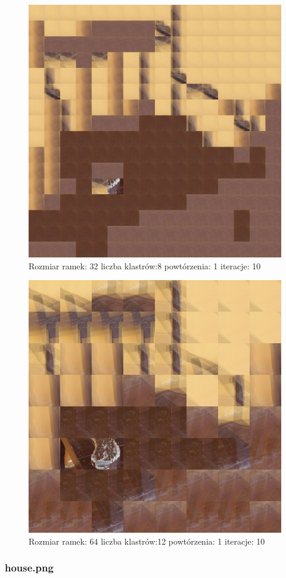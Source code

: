 \documentclass{classrep}
\begin{document}
{{{{\begin{figure}[!htbp]
\centering
\includegraphics[width=\textwidth,width=90mm]{obrazy/chair_R32_K8_P1_It10.png}
\caption{Rozmiar ramek: 32 liczba klastrów:8 powtórzenia: 1 iteracje: 10 }
\end{figure}

\begin{figure}[!htbp]
\centering
\includegraphics[width=\textwidth,width=90mm]{obrazy/chair_R64_K12_P1_It10.png}
\caption{Rozmiar ramek: 64 liczba klastrów:12 powtórzenia: 1 iteracje: 10 }
\end{figure}
\FloatBarrier
}

\subsubsection{house.png}
{

}}}}
\end{document}
